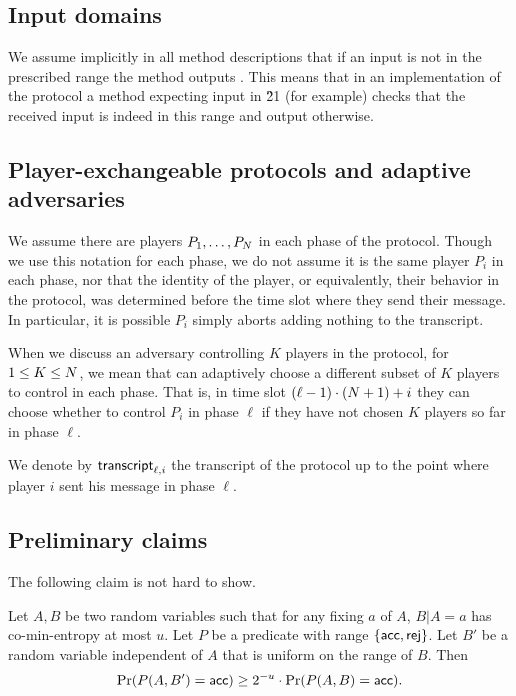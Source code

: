 \documentclass{article}
\begin{document}
\subsection{Input domains}

We assume implicitly in all method descriptions that if an input is not in the prescribed range the method outputs \rej.
This means that in an implementation of the protocol a method expecting input in \G21 (for example) checks that the received input is indeed in this range and output \rej otherwise.


\subsection{Player-exchangeable protocols and adaptive adversaries}\label{subsec:adaptiveadv}
We assume there are \numplayers players $P_1,\ldots,P_N$ in each phase of the protocol.
Though we use this notation for each phase, we do not assume it is the same player $P_i$ in each phase, nor that 
the identity of the player, or equivalently, their behavior in the protocol, was determined before the time slot where they send their message.
In particular, it is possible $P_i$ simply aborts adding nothing to the transcript.

When we discuss an adversary \adv controlling $K$ players in the protocol, for $1\leq K \leq N$,
we mean that \adv can adaptively choose a different subset of $K$ players to control in each phase. That is,
in time slot $(\ell-1)\cdot (N+1) + i$ they can choose whether to control $P_i$ in phase $\ell$ if they have not
chosen $K$ players so far in phase $\ell$.

We denote by $\mathsf{transcript}_{\ell,i}$ the transcript of the protocol up to the point where player $i$ sent his message in phase $\ell$.

\subsection{Preliminary claims} 

The following claim is not hard to show.
\begin{claim}\label{clm:coentropy}
 Let $A,B$ be two random variables such that for any fixing $a$ of $A$,
 $B|A=a$ has co-min-entropy at most $u$.
 Let $P$ be a predicate with range $\left\{\mathsf{acc},\mathsf{rej}\right\}$.
 Let $B'$ be a random variable independent of $A$ that is uniform on the range of $B$.
 Then
 \[\mathrm{Pr}(P(A,B') = \mathsf{acc})\geq 2^{-u}\cdot \mathrm{Pr}(P(A,B) = \mathsf{acc}).\] 
\end{claim}
\end{document}
